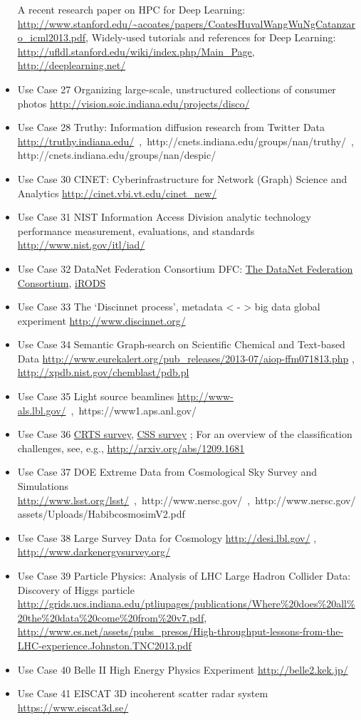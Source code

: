 \begin{itemize}
  A recent research paper on HPC for Deep Learning:
  \url{http://www.stanford.edu/~acoates/papers/CoatesHuvalWangWuNgCatanzaro_icml2013.pdf},
  Widely-used tutorials and references for Deep Learning:
  \url{http://ufldl.stanford.edu/wiki/index.php/Main_Page},
  \url{http://deeplearning.net/}
\item
  Use Case 27 Organizing large-scale, unstructured collections of
  consumer photos \url{http://vision.soic.indiana.edu/projects/disco/}
\item
  Use Case 28 Truthy: Information diffusion research from Twitter Data
  \url{http://truthy.indiana.edu/}~,~http://cnets.indiana.edu/groups/nan/truthy/~,~http://cnets.indiana.edu/groups/nan/despic/
\item
  Use Case 30 CINET: Cyberinfrastructure for Network (Graph) Science and
  Analytics \url{http://cinet.vbi.vt.edu/cinet_new/}
\item
  Use Case 31 NIST Information Access Division analytic technology
  performance measurement, evaluations, and standards
  \url{http://www.nist.gov/itl/iad/}
\item
  Use Case 32 DataNet Federation Consortium DFC:
  \href{http://datafed.org/}{The DataNet Federation Consortium},
  \href{http://irods.org/}{iRODS}
\item
  Use Case 33 The `Discinnet process', metadata \textless{} -
  \textgreater{} big data global experiment
  \url{http://www.discinnet.org/}
\item
  Use Case 34 Semantic Graph-search on Scientific Chemical and
  Text-based Data
  \url{http://www.eurekalert.org/pub_releases/2013-07/aiop-ffm071813.php}
 , \url{http://xpdb.nist.gov/chemblast/pdb.pl}
\item
  Use Case 35 Light source beamlines
  \url{http://www-als.lbl.gov/}~,~https://www1.aps.anl.gov/
\item
  Use Case 36 \href{http://crts.caltech.edu/}{CRTS survey},
  \href{http://www.lpl.arizona.edu/css/}{CSS survey} ; For an overview
  of the classification challenges, see, e.g.,
  \url{http://arxiv.org/abs/1209.1681}
\item
  Use Case 37 DOE Extreme Data from Cosmological Sky Survey and
  Simulations
  \url{http://www.lsst.org/lsst/}~,~http://www.nersc.gov/~,~http://www.nersc.gov/assets/Uploads/HabibcosmosimV2.pdf
\item
  Use Case 38 Large Survey Data for Cosmology \url{http://desi.lbl.gov/}
 , \url{http://www.darkenergysurvey.org/}

\item
  Use Case 39 Particle Physics: Analysis of LHC Large Hadron Collider
  Data: Discovery of Higgs particle
  \url{http://grids.ucs.indiana.edu/ptliupages/publications/Where\%20does\%20all\%20the\%20data\%20come\%20from\%20v7.pdf},
  \url{http://www.es.net/assets/pubs_presos/High-throughput-lessons-from-the-LHC-experience.Johnston.TNC2013.pdf}
\item
  Use Case 40 Belle II High Energy Physics Experiment
  \url{http://belle2.kek.jp/}
\item
  Use Case 41 EISCAT 3D incoherent scatter radar system
  \url{https://www.eiscat3d.se/}


\end{itemize}
